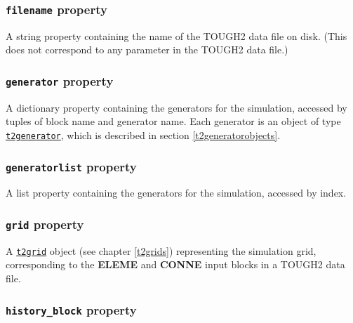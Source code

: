 \begin{snugshade}
\subsubsection{\texttt{filename} property}
\end{snugshade}
\label{sec:t2data:filename}

A string property containing the name of the TOUGH2 data file on disk.  (This does not correspond to any parameter in the TOUGH2 data file.)

\begin{snugshade}
\subsubsection{\texttt{generator} property}
\end{snugshade}
\label{sec:t2data:generator}

A dictionary property containing the generators for the simulation, accessed by tuples of block name and generator name.  Each generator is an object of type \hyperref[t2generatorobjects]{\texttt{t2generator}}, which is described in section \ref{t2generatorobjects}.

\begin{snugshade}
\subsubsection{\texttt{generatorlist} property}
\end{snugshade}
\label{sec:t2data:generatorlist}

A list property containing the generators for the simulation, accessed by index.

\begin{snugshade}
\subsubsection{\texttt{grid} property}
\end{snugshade}
\label{sec:t2data:grid}

A \hyperref[t2grids]{\texttt{t2grid}} object (see chapter \ref{t2grids}) representing the simulation grid, corresponding to the \textbf{ELEME} and \textbf{CONNE} input blocks in a TOUGH2 data file.

\begin{snugshade}
\subsubsection{\texttt{history\_block} property}
\end{snugshade}
\label{sec:t2data:history_block}

